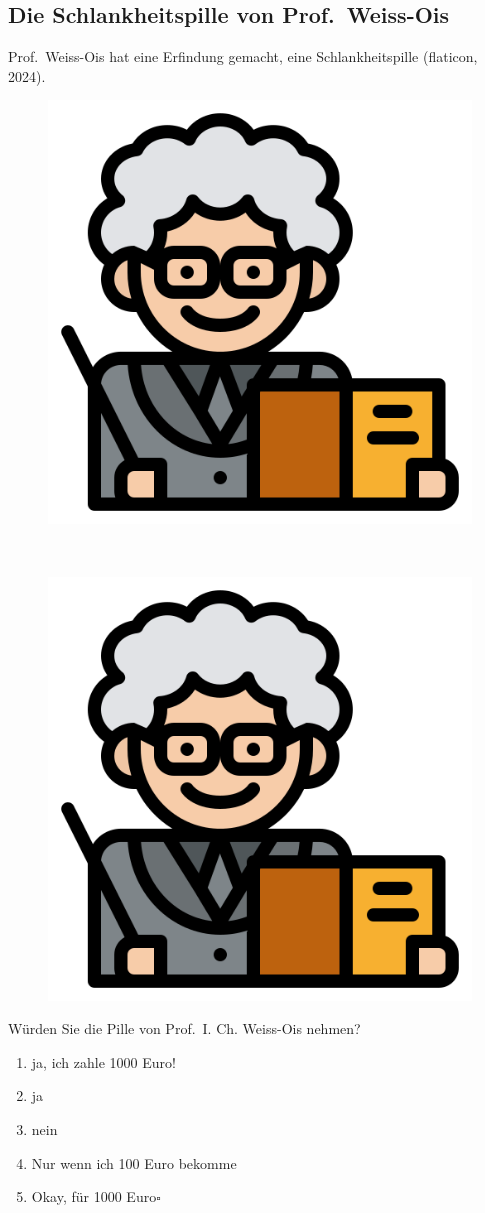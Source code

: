 \documentclass[
  letterpaper,
]{scrbook}
\providecommand{\tightlist}{%
  \setlength{\itemsep}{0pt}\setlength{\parskip}{0pt}}\usepackage{longtable,booktabs,array}
\theoremstyle{definition}
\theoremstyle{definition}
\theoremstyle{definition}
\theoremstyle{remark}
\begin{document}
\subsection{Die Schlankheitspille von
Prof.~Weiss-Ois}\label{sec-weiss-ois}

Prof.~Weiss-Ois hat eine Erfindung gemacht, eine Schlankheitspille
(flaticon, 2024).

\begin{figure}

\begin{minipage}{0.46\linewidth}

\includegraphics[width=0.25\linewidth,height=\textheight,keepaspectratio]{img/teacher.png}

\end{minipage}%
%
\begin{minipage}{0.09\linewidth}
~\end{minipage}%
%
\begin{minipage}{0.46\linewidth}

\includegraphics[width=0.25\linewidth,height=\textheight,keepaspectratio]{img/teacher.png}

\end{minipage}%

\end{figure}%

Würden Sie die Pille von Prof.~I. Ch. Weiss-Ois nehmen?

\begin{enumerate}
\def\labelenumi{\alph{enumi})}
\tightlist
\item
  ja, ich zahle 1000 Euro!
\item
  ja
\item
  nein
\item
  Nur wenn ich 100 Euro bekomme
\item
  Okay, für 1000 Euro\(\square\)
\end{enumerate}
\end{document}

